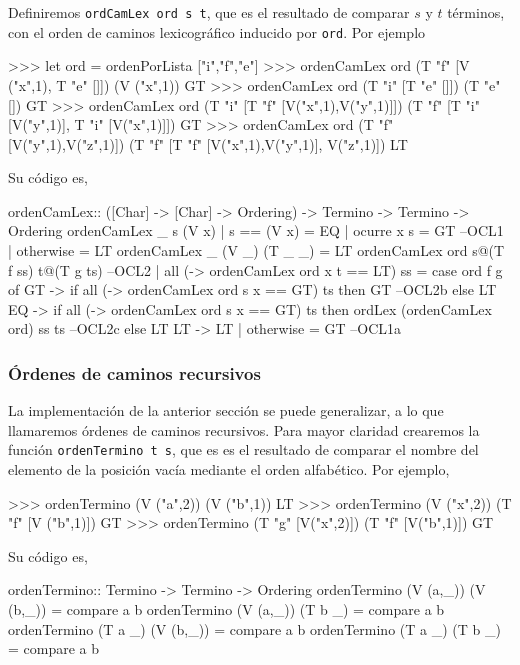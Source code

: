 Definiremos \texttt{ordCamLex ord s t}, que es el resultado de
comparar $s$ y $t$ términos, con el orden de caminos lexicográfico
inducido por \texttt{ord}. Por ejemplo

\begin{sesion}
>>> let ord = ordenPorLista ["i","f","e"]
>>> ordenCamLex ord (T "f" [V ("x",1), T "e" []]) (V ("x",1))
GT
>>> ordenCamLex ord (T "i" [T "e" []]) (T "e" [])
GT
>>> ordenCamLex ord (T "i" [T "f" [V("x",1),V("y",1)]])
                      (T "f" [T "i" [V("y",1)], T "i" [V("x",1)]])
GT
>>> ordenCamLex ord (T "f" [V("y",1),V("z",1)])
                      (T "f" [T "f" [V("x",1),V("y",1)], V("z",1)])
LT
\end{sesion}

Su código es,

\begin{codigo}
 ordenCamLex:: ([Char] -> [Char] -> Ordering)
                -> Termino -> Termino -> Ordering
ordenCamLex _ s (V x)
  | s == (V x) = EQ
  | ocurre x s = GT --OCL1
  | otherwise = LT
ordenCamLex _ (V _) (T _ _) = LT
ordenCamLex ord s@(T f ss) t@(T g ts) --OCL2
  | all (\x -> ordenCamLex ord x t == LT) ss
    = case ord f g of
      GT -> if all (\x -> ordenCamLex ord s x == GT) ts
            then GT --OCL2b
            else LT
      EQ -> if all (\x -> ordenCamLex ord s x == GT) ts
            then ordLex (ordenCamLex ord) ss ts --OCL2c
            else LT
      LT -> LT  
  | otherwise = GT --OCL1a
\end{codigo}

\subsubsection{Órdenes de caminos recursivos}

La implementación de la anterior sección se puede generalizar, a lo
que llamaremos órdenes de caminos recursivos. Para mayor claridad
crearemos la función \texttt{ordenTermino t s}, que es es el
resultado de comparar el nombre del elemento de la posición vacía
mediante el orden alfabético. Por ejemplo,

\begin{sesion}
>>> ordenTermino (V ("a",2)) (V ("b",1))
LT
>>> ordenTermino (V ("x",2)) (T "f" [V ("b",1)])
GT
>>> ordenTermino (T "g" [V("x",2)]) (T "f" [V("b",1)])
GT
\end{sesion}

Su código es,

\begin{codigo}
ordenTermino::  Termino -> Termino -> Ordering
ordenTermino (V (a,_)) (V (b,_)) = compare a b
ordenTermino (V (a,_)) (T b _) = compare a b
ordenTermino (T a _) (V (b,_)) = compare a b
ordenTermino (T a _) (T b _) = compare a b
\end{codigo}


